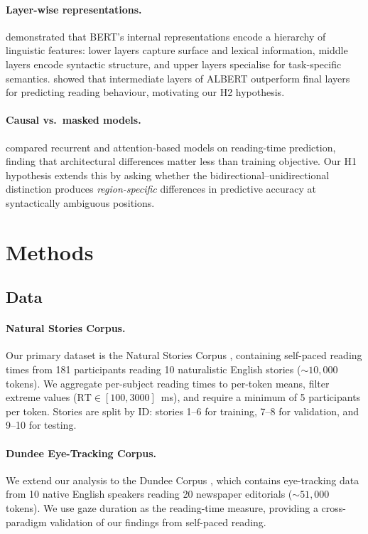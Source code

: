 \documentclass[11pt]{article}
\begin{document}
\paragraph{Layer-wise representations.}
\citet{jawahar2019} demonstrated that BERT's internal representations encode a hierarchy of linguistic features: lower layers capture surface and lexical information, middle layers encode syntactic structure, and upper layers specialise for task-specific semantics.
\citet{lan2020} showed that intermediate layers of ALBERT outperform final layers for predicting reading behaviour, motivating our H2 hypothesis.

\paragraph{Causal vs.\ masked models.}
\citet{merkx2021} compared recurrent and attention-based models on reading-time prediction, finding that architectural differences matter less than training objective.
Our H1 hypothesis extends this by asking whether the bidirectional--unidirectional distinction produces \emph{region-specific} differences in predictive accuracy at syntactically ambiguous positions.

\section{Methods}

\subsection{Data}

\paragraph{Natural Stories Corpus.}
Our primary dataset is the Natural Stories Corpus \citep{futrell2021}, containing self-paced reading times from 181 participants reading 10 naturalistic English stories (${\sim}10{,}000$ tokens).
We aggregate per-subject reading times to per-token means, filter extreme values ($\text{RT} \in [100, 3000]$~ms), and require a minimum of 5 participants per token.
Stories are split by ID: stories 1--6 for training, 7--8 for validation, and 9--10 for testing.

\paragraph{Dundee Eye-Tracking Corpus.}
We extend our analysis to the Dundee Corpus \citep{kennedy2003}, which contains eye-tracking data from 10 native English speakers reading 20 newspaper editorials (${\sim}51{,}000$ tokens).
We use gaze duration as the reading-time measure, providing a cross-paradigm validation of our findings from self-paced reading.
\end{document}
